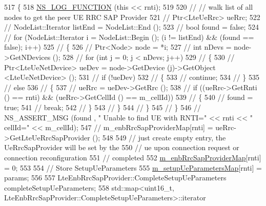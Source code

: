 \begin{DoxyCode}
517 \{
518   \hyperlink{log-macros-disabled_8h_a90b90d5bad1f39cb1b64923ea94c0761}{NS\_LOG\_FUNCTION} (\textcolor{keyword}{this} << rnti);
519 
520   \textcolor{comment}{// // walk list of all nodes to get the peer UE RRC SAP Provider}
521   \textcolor{comment}{// Ptr<LteUeRrc> ueRrc;}
522   \textcolor{comment}{// NodeList::Iterator listEnd = NodeList::End ();}
523   \textcolor{comment}{// bool found = false;}
524   \textcolor{comment}{// for (NodeList::Iterator i = NodeList::Begin (); (i != listEnd) && (found == false); i++)}
525   \textcolor{comment}{//   \{}
526   \textcolor{comment}{//     Ptr<Node> node = *i;}
527   \textcolor{comment}{//     int nDevs = node->GetNDevices ();}
528   \textcolor{comment}{//     for (int j = 0; j < nDevs; j++)}
529   \textcolor{comment}{//       \{}
530   \textcolor{comment}{//         Ptr<LteUeNetDevice> ueDev = node->GetDevice (j)->GetObject <LteUeNetDevice> ();}
531   \textcolor{comment}{//         if (!ueDev)}
532   \textcolor{comment}{//           \{}
533   \textcolor{comment}{//             continue;}
534   \textcolor{comment}{//           \}}
535   \textcolor{comment}{//         else}
536   \textcolor{comment}{//           \{}
537   \textcolor{comment}{//             ueRrc = ueDev->GetRrc ();}
538   \textcolor{comment}{//             if ((ueRrc->GetRnti () == rnti) && (ueRrc->GetCellId () == m\_cellId))}
539   \textcolor{comment}{//               \{}
540   \textcolor{comment}{//              found = true;}
541   \textcolor{comment}{//              break;}
542   \textcolor{comment}{//               \}}
543   \textcolor{comment}{//           \}}
544   \textcolor{comment}{//       \}}
545   \textcolor{comment}{//   \}}
546   \textcolor{comment}{// NS\_ASSERT\_MSG (found , " Unable to find UE with RNTI=" << rnti << " cellId=" << m\_cellId);}
547   \textcolor{comment}{// m\_enbRrcSapProviderMap[rnti] = ueRrc->GetLteUeRrcSapProvider ();}
548 
549   \textcolor{comment}{// just create empty entry, the UeRrcSapProvider will be set by the}
550   \textcolor{comment}{// ue upon connection request or connection reconfiguration}
551   \textcolor{comment}{// completed }
552   \hyperlink{classns3_1_1MmWaveLteEnbRrcProtocolReal_a6ad34a29c142602d2a58b0bfb718c22b}{m\_enbRrcSapProviderMap}[rnti] = 0;
553 
554   \textcolor{comment}{// Store SetupUeParameters}
555   \hyperlink{classns3_1_1MmWaveLteEnbRrcProtocolReal_a3df42581baab5d1a95e3a7f280d0e831}{m\_setupUeParametersMap}[rnti] = params;
556 
557   LteEnbRrcSapProvider::CompleteSetupUeParameters completeSetupUeParameters;
558   std::map<uint16\_t, LteEnbRrcSapProvider::CompleteSetupUeParameters>::iterator 

\end{DoxyCode}
